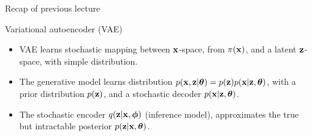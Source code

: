 

\usepackage{tikz}

\usetikzlibrary{arrows,shapes,positioning,shadows,trees}

\begin{frame}
\titlepage
\end{frame}
\begin{frame}{Recap of previous lecture}
	\begin{minipage}[t]{0.55\columnwidth}
		\begin{block}{Variational autoencoder (VAE)}
		    \begin{itemize}
			    \item VAE learns stochastic mapping between $\mathbf{x}$-space, from $\pi(\mathbf{x})$, and a latent $\mathbf{z}$-space, with simple distribution. 
			    \item The generative model learns  distribution $p(\mathbf{x}, \mathbf{z} | \boldsymbol{\theta}) = p(\mathbf{z}) p(\mathbf{x} |\mathbf{z}, \boldsymbol{\theta})$, with a prior distribution $p(\mathbf{z})$, and a stochastic decoder $p(\mathbf{x}|\mathbf{z}, \boldsymbol{\theta})$. 
			    \item The stochastic encoder $q(\mathbf{z}|\mathbf{x}, \boldsymbol{\phi})$ (inference model), approximates the true but intractable posterior $p(\mathbf{z}|\mathbf{x}, \boldsymbol{\theta})$.
		    \end{itemize}
	    \end{block}
	\end{minipage}%
	\begin{minipage}[t]{0.45\columnwidth}
		\vspace{0.7cm}
		\begin{figure}[h]
			\centering

\end{figure}
\end{minipage}
\end{frame}

